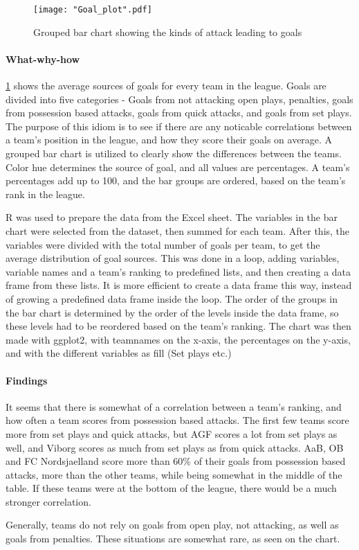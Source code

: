 \documentclass[Report.tex]{subfiles}
\begin{document}
\begin{figure}
\center
\texttt{[image: "Goal\_plot".pdf]}
\caption{Grouped bar chart showing the kinds of attack leading to goals}
\label{Fig:Goal_plot}
\end{figure}

\paragraph{What-why-how\\}
\ref{Fig:Goal_plot} shows the average sources of goals for every team in the
league. Goals are divided into five categories - Goals from not attacking open
plays, penalties, goals from possession based attacks, goals from quick attacks,
and goals from set plays. 
The purpose of this idiom is to see if there are any noticable correlations
between a team's position in the league, and how they score their goals on
average. 
A grouped bar chart is utilized to clearly show the differences between the
teams. Color hue determines the source of goal, and all values are
percentages. A team's percentages add up to 100, and the bar groups are ordered,
based on the team's rank in the league. 

R was used to prepare the data from the Excel sheet. The variables in the bar
chart were selected from the dataset, then summed for each team. After this, the
variables were divided with the total number of goals per team, to get the
average distribution of goal sources. 
This was done in a loop, adding variables, variable names and a team's ranking
to predefined lists, and then creating a data frame from these lists. It is more
efficient to create a data frame this way, instead of growing a predefined data
frame inside the loop. 
The order of the groups in the bar chart is determined by the order of the
levels inside the data frame, so these levels had to be reordered based on the
team's ranking.
The chart was then made with ggplot2, with teamnames on the x-axis, the
percentages on the y-axis, and with the different variables as fill (Set plays
etc.)

\paragraph{Findings\\}
It seems that there is somewhat of a correlation between a team's ranking, and how often a team scores from possession based attacks. The first few teams score more from set plays and quick attacks, but AGF scores a lot from set plays as well, and Viborg scores as much from set plays as from quick attacks. AaB, OB and FC Nordsjaelland score more than 60\% of their goals from possession based attacks, more than the other teams, while being somewhat in the middle of the table. If these teams were at the bottom of the league, there would be a much stronger correlation. 

Generally, teams do not rely on goals from open play, not attacking, as well as goals from penalties. These situations are somewhat rare, as seen on the chart. 
\end{document}
